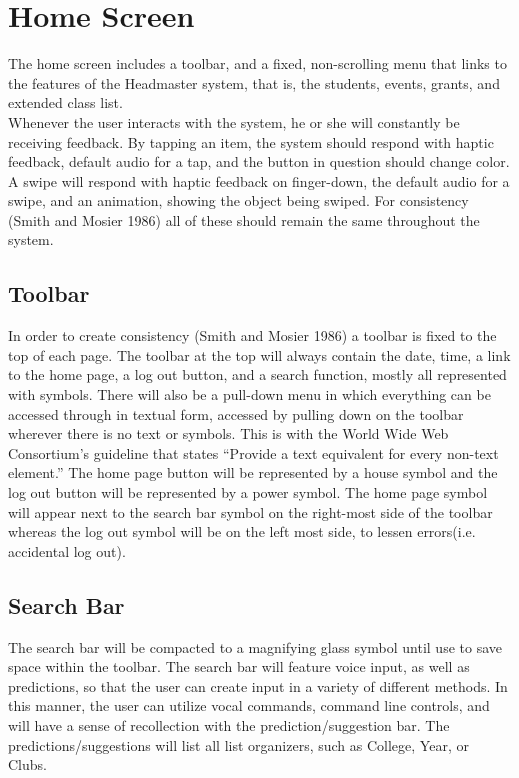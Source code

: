 \documentclass[12pt onesided letterpaper]{article}
\begin{document}
\section*{Home Screen}
The home screen includes a toolbar, and a fixed, non-scrolling menu that links to the features of the Headmaster system, that is, the students, events, grants, and extended class list.  
\\
Whenever the user interacts with the system, he or she will constantly be receiving feedback.  By tapping an item, the system should respond with haptic feedback, default audio for a tap, and the button in question should change color. A swipe will respond with haptic feedback on finger-down, the default audio for a swipe, and an animation, showing the object being swiped. For consistency (Smith and Mosier 1986)\cite{dondi12} all of these should remain the same throughout the system.
\\
\subsection*{Toolbar}
In order to create consistency (Smith and Mosier 1986)\cite{dondi12} a toolbar is fixed to the top of each page. The toolbar at the top will always contain the date, time, a link to the home page, a log out button, and a search function, mostly all represented with symbols.  There will also be a pull-down menu in which everything can be accessed through in textual form, accessed by pulling down on the toolbar wherever there is no text or symbols.  This is with the World Wide Web Consortium's guideline that states “Provide a text equivalent for every non-text element.” The home page button will be represented by a house symbol and the log out button will be represented by a power symbol.  The home page symbol will appear next to the search bar symbol on the right-most side of the toolbar whereas the log out symbol will be on the left most side, to lessen errors(i.e. accidental log out).     
\\
\subsection*{Search Bar}
The search bar will be compacted to a magnifying glass symbol until use to save space within the toolbar.  The search bar will feature voice input, as well as predictions, so that the user can create input in a variety of different methods.  In this manner, the user can utilize vocal commands, command line controls, and will have a sense of recollection with the prediction/suggestion bar. The predictions/suggestions will list all list organizers, such as College, Year, or Clubs. 
\\
\end{document}
